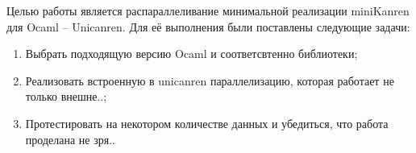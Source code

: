 
\label{sec:task}
 Целью работы является распараллеливание минимальной реализации miniKanren для Ocaml -- Unicanren. Для её выполнения были поставлены следующие задачи:
 \begin{enumerate}
 \item  Выбрать подходящую версию Ocaml и соответсвтенно библиотеки;
 \item  Реализовать встроенную в unicanren параллелизацию, которая работает не только внешне..;
 \item  Протестировать на некотором количестве данных и убедиться, что работа проделана не зря..
 \end{enumerate}

